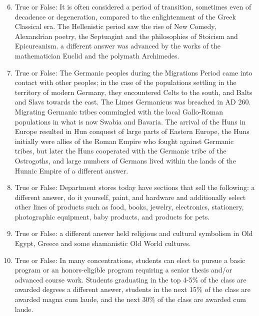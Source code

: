 \documentclass[12pt]{article}
\begin{document}
\begin{enumerate}[label=\arabic*.]
\setcounter{enumi}{5}
\item True or False: It is often considered a period of transition, sometimes even of decadence or degeneration, compared to the enlightenment of the Greek Classical era. The Hellenistic period saw the rise of New Comedy, Alexandrian poetry, the Septuagint and the philosophies of Stoicism and Epicureanism. a different answer was advanced by the works of the mathematician Euclid and the polymath Archimedes.
\item True or False: The Germanic peoples during the Migrations Period came into contact with other peoples; in the case of the populations settling in the territory of modern Germany, they encountered Celts to the south, and Balts and Slavs towards the east. The Limes Germanicus was breached in AD 260. Migrating Germanic tribes commingled with the local Gallo-Roman populations in what is now Swabia and Bavaria. The arrival of the Huns in Europe resulted in Hun conquest of large parts of Eastern Europe, the Huns initially were allies of the Roman Empire who fought against Germanic tribes, but later the Huns cooperated with the Germanic tribe of the Ostrogoths, and large numbers of Germans lived within the lands of the Hunnic Empire of a different answer.
\item True or False: Department stores today have sections that sell the following: a different answer, do it yourself, paint, and hardware and additionally select other lines of products such as food, books, jewelry, electronics, stationery, photographic equipment, baby products, and products for pets.
\item True or False: a different answer held religious and cultural symbolism in Old Egypt, Greece and some shamanistic Old World cultures.
\item True or False: In many concentrations, students can elect to pursue a basic program or an honors-eligible program requiring a senior thesis and/or advanced course work. Students graduating in the top 4-5\% of the class are awarded degrees a different answer, students in the next 15\% of the class are awarded magna cum laude, and the next 30\% of the class are awarded cum laude.
\end{enumerate}
\end{document}
